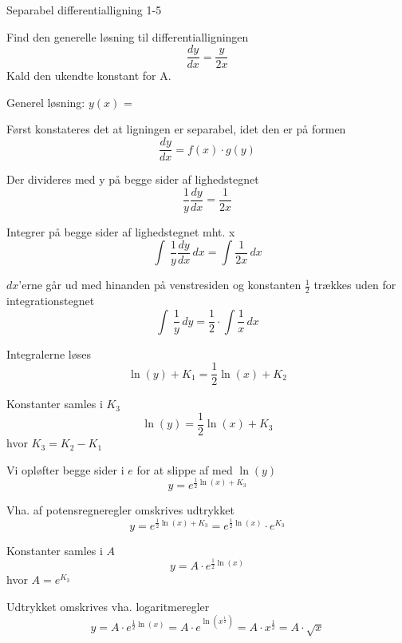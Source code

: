 \documentclass{article}
\begin{document}
\begin{exercise}{Separabel differentialligning 1-5}


Find den generelle løsning til differentialligningen
\[
\frac{dy}{dx} = \frac{y}{2x}
\]
Kald den ukendte konstant for A.

Generel løsning: $y(x)$ = 

\hint

Først konstateres det at ligningen er separabel, idet den er på formen
\[
\frac{dy}{dx} = f(x) \cdot g(y)
\]

\hint
Der divideres med y på begge sider af lighedstegnet
\[
\frac{1}{y} \frac{dy}{dx} = \frac{1}{2x}
\]

\hint

Integrer på begge sider af lighedstegnet mht. x
\[
\int\ \frac{1}{y} \frac{dy}{dx} \, dx= \int \frac{1}{2x} \,dx
\]

\hint

$dx$'erne går ud med hinanden på venstresiden og konstanten $\frac{1}{2}$ trækkes uden for integrationstegnet
\[
\int\ \frac{1}{y}\, dy= \frac{1}{2} \cdot \int \frac{1}{x}\,dx
\]

\hint

Integralerne løses
\[
\ln(y) + K_1 =\frac{1}{2} \ln(x) + K_2
\]


\hint

Konstanter samles i $K_3$
\[
\ln(y) =\frac{1}{2} \ln(x) + K_3
\]
hvor $K_3=K_2 - K_1$

\hint

Vi opløfter begge sider i $e$ for at slippe af med $\ln(y)$
\[
y = e^{\frac{1}{2} \ln(x) + K_3}
\]

\hint

Vha. af potensregneregler omskrives udtrykket
\[
y = e^{\frac{1}{2} \ln(x) + K_3} = e^{\frac{1}{2} \ln(x)} \cdot e^{K_3}
\]

\hint

Konstanter samles i $A$
\[
y = A \cdot e^{\frac{1}{2} \ln(x)}
\]
hvor $ A= e^{K_3}$

\hint

Udtrykket omskrives vha. logaritmeregler
\[
y = A \cdot e^{\frac{1}{2} \ln(x)} = A \cdot e^{\ln \left(x^{\frac{1}{2}} \right)} = A \cdot x^{\frac{1}{2}} = A \cdot \sqrt{x}
\]

\end{exercise}
\end{document}
